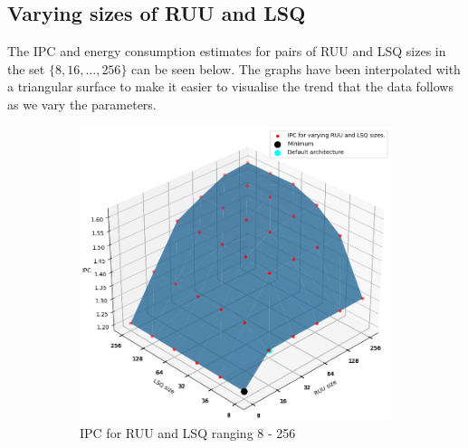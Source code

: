 \documentclass[11pt]{article}
\begin{document}
\subsection*{Varying sizes of RUU and LSQ}
\vspace{-0.5em}
The IPC and energy consumption estimates for pairs of RUU and LSQ sizes in the
set $\lbrace 8, 16, \ldots, 256 \rbrace$ can be seen below. The graphs have been
interpolated with a triangular surface to make it easier to visualise the trend
that the data follows as we vary the parameters.
\vspace{-2em}
\begin{figure}[H]
  \centering
  \begin{subfigure}{.5\textwidth}
    \centering
    \includegraphics[width=1.0\textwidth]{"../plots/vary-ruu-lsq-3d-ipc-good-angle.png"}
    \caption{IPC for RUU and LSQ ranging 8 - 256}
    \label{fig:sub1}
  \end{subfigure}%
  \begin{subfigure}{.5\textwidth}
    \centering

\end{subfigure}
\end{figure}
\end{document}
